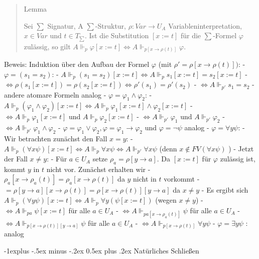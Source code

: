 \documentclass[a4paper]{article}
\makeatletter
\renewcommand{\subsection}{\@startsection{subsection}{2}{0mm}%
                {-1explus -.5ex minus -.2ex}%
                {0.5ex plus .2ex}%
                {\normalfont\normalsize\bfseries}}
\makeatother
\begin{document}
\begin{multicols}{3}
  \begin{quote}
    Lemma

    Sei $\sum$ Signatur, A $\sum$-Struktur, $\rho:Var\rightarrow U_A$
    Variableninterpretation, $x\in Var$ und $t\in T_{\sum}$. Ist die
    Substitution $[x:=t]$ für die $\sum$-Formel $\varphi$ zulässig, so gilt
    $A\Vdash_p\varphi [x:=t]\Leftrightarrow  A\Vdash_{p[x\rightarrow \rho(t)]}\varphi$.
  \end{quote}

  Beweis: Induktion über den Aufbau der Formel $\varphi$ (mit
  $\rho'=\rho[x\rightarrow \rho(t)])$: - $\varphi = (s_1 =s_2)$: -
  $A\Vdash_p(s_1 =s_2)[x:=t] \Leftrightarrow A\Vdash_p s_1[x:=t] =s_2[x:=t]$
  -
  $\Leftrightarrow \rho(s_1[x:=t]) =\rho(s_2[x:=t])\Leftrightarrow \rho'(s_1) =\rho'(s_2)$
  - $\Leftrightarrow A\Vdash_{p'} s_1 =s_2$ - andere atomare Formeln
  analog - $\varphi =\varphi_1\wedge\varphi_2$: -
  $A\Vdash_p(\varphi_1\wedge\varphi_2)[x:=t] \Leftrightarrow A\Vdash_p\varphi_1 [x:=t]\wedge\varphi_2[x:=t]$
  - $\Leftrightarrow A\Vdash_p\varphi_1[x:=t]$ und
  $A\Vdash_p\varphi_2[x:=t]$ - $\Leftrightarrow A\Vdash_{p'}\varphi_1$ und
  $A\Vdash_{p'}\varphi_2$ -
  $\Leftrightarrow A\Vdash_{p'}\varphi_1\wedge\varphi_2$ -
  $\varphi=\varphi_1\vee\varphi_2,\varphi =\varphi_1\rightarrow\varphi_2$
  und $\varphi=\lnot\psi$ analog - $\varphi=\forall y\psi$: - Wir
  betrachten zunächst den Fall $x=y$: -
  $A\Vdash_p(\forall x\psi)[x:=t]\Leftrightarrow A\Vdash_p\forall x\psi \Leftrightarrow A\Vdash_{p'}\forall x\psi$
  (denn $x\not\in FV(\forall x\psi)$ ) - Jetzt der Fall $x\not=y$: - Für
  $a\in U_A$ setze $\rho_a=\rho[y\rightarrow a]$. Da $[x:=t]$ für
  $\varphi$ zulässig ist, kommt $y$ in $t$ nicht vor. Zunächst erhalten
  wir - $\rho_a[x\rightarrow \rho_a(t)] = \rho_a[x\rightarrow \rho(t)]$ da
  $y$ nicht in $t$ vorkommt -
  $=\rho[y\rightarrow a][x\rightarrow \rho(t)] = \rho[x\rightarrow \rho(t)][y\rightarrow a]$
  da $x\not=y$ - Es ergibt sich
  $A\Vdash_p(\forall y\psi)[x:=t]\Leftrightarrow A\Vdash_p\forall y(\psi[x:=t])$
  (wegen $x\not=y$) - $\Leftrightarrow A\Vdash_{pa}\psi[x:=t]$ für alle
  $a\in U_A$ - $\Leftrightarrow A\Vdash_{pa[x\rightarrow \rho_a(t)]}\psi$
  für alle $a\in U_A$ -
  $\Leftrightarrow A\Vdash_{p[x\rightarrow \rho(t)][y\rightarrow a]}\psi$
  für alle $a\in U_A$ -
  $\Leftrightarrow A\Vdash_{p[x\rightarrow \rho(t)]}\forall y\psi$ -
  $\varphi=\exists y\psi$ : analog

  \subsection{Natürliches Schließen}\label{natuxfcrliches-schlieuxdfen-1}


\end{multicols}
\end{document}
